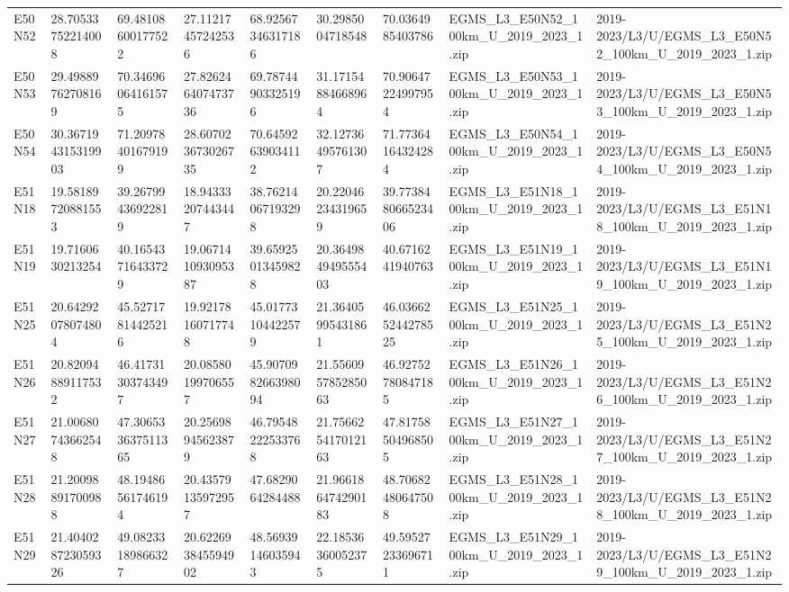 \begin{landscape}
\begin{longtable}{lllllllll}
E50N52 & 28.70533752214008 & 69.48108600177522 & 27.11217457242536 & 68.92567346317186 & 30.2985004718548 & 70.0364985403786 & EGMS\_L3\_E50N52\_100km\_U\_2019\_2023\_1.zip & 2019-2023/L3/U/EGMS\_L3\_E50N52\_100km\_U\_2019\_2023\_1.zip \\
E50N53 & 29.49889762708169 & 70.34696064161575 & 27.826246407473736 & 69.78744903325196 & 31.17154884668964 & 70.90647224997954 & EGMS\_L3\_E50N53\_100km\_U\_2019\_2023\_1.zip & 2019-2023/L3/U/EGMS\_L3\_E50N53\_100km\_U\_2019\_2023\_1.zip \\
E50N54 & 30.367194315319903 & 71.20978401679199 & 28.607023673026735 & 70.64592639034112 & 32.12736495761307 & 71.77364164324284 & EGMS\_L3\_E50N54\_100km\_U\_2019\_2023\_1.zip & 2019-2023/L3/U/EGMS\_L3\_E50N54\_100km\_U\_2019\_2023\_1.zip \\
E51N18 & 19.58189720881553 & 39.26799436922819 & 18.94333207443447 & 38.76214067193298 & 20.22046234319659 & 39.773848066523406 & EGMS\_L3\_E51N18\_100km\_U\_2019\_2023\_1.zip & 2019-2023/L3/U/EGMS\_L3\_E51N18\_100km\_U\_2019\_2023\_1.zip \\
E51N19 & 19.7160630213254 & 40.16543716433729 & 19.067141093095387 & 39.65925013459828 & 20.364984949555403 & 40.6716241940763 & EGMS\_L3\_E51N19\_100km\_U\_2019\_2023\_1.zip & 2019-2023/L3/U/EGMS\_L3\_E51N19\_100km\_U\_2019\_2023\_1.zip \\
E51N25 & 20.64292078074804 & 45.52717814425216 & 19.92178160717748 & 45.01773104422579 & 21.36405995431861 & 46.036625244278525 & EGMS\_L3\_E51N25\_100km\_U\_2019\_2023\_1.zip & 2019-2023/L3/U/EGMS\_L3\_E51N25\_100km\_U\_2019\_2023\_1.zip \\
E51N26 & 20.82094889117532 & 46.41731303743497 & 20.08580199706557 & 45.907098266398094 & 21.556095785285063 & 46.92752780847185 & EGMS\_L3\_E51N26\_100km\_U\_2019\_2023\_1.zip & 2019-2023/L3/U/EGMS\_L3\_E51N26\_100km\_U\_2019\_2023\_1.zip \\
E51N27 & 21.00680743662548 & 47.306533637511365 & 20.25698945623879 & 46.79548222533768 & 21.756625417012163 & 47.81758504968505 & EGMS\_L3\_E51N27\_100km\_U\_2019\_2023\_1.zip & 2019-2023/L3/U/EGMS\_L3\_E51N27\_100km\_U\_2019\_2023\_1.zip \\
E51N28 & 21.20098891700988 & 48.19486561746194 & 20.43579135972957 & 47.6829064284488 & 21.966186474290183 & 48.70682480647508 & EGMS\_L3\_E51N28\_100km\_U\_2019\_2023\_1.zip & 2019-2023/L3/U/EGMS\_L3\_E51N28\_100km\_U\_2019\_2023\_1.zip \\
E51N29 & 21.404028723059326 & 49.08233189866327 & 20.622693845594902 & 48.56939146035943 & 22.18536360052375 & 49.59527233696711 & EGMS\_L3\_E51N29\_100km\_U\_2019\_2023\_1.zip & 2019-2023/L3/U/EGMS\_L3\_E51N29\_100km\_U\_2019\_2023\_1.zip \\

\end{longtable}
\end{landscape}
